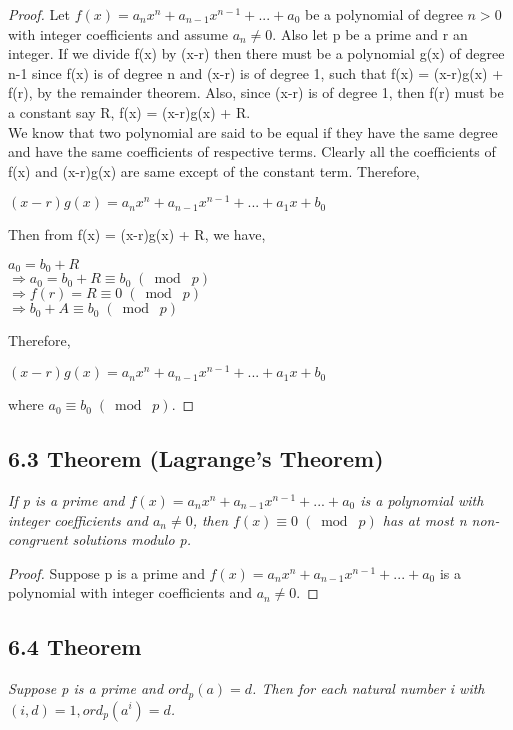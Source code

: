 \documentclass{article}
\begin{document}
\begin{proof}
Let $f(x) = a_nx^n + a_{n-1}x^{n-1} + ... + a_0$ be a polynomial of degree $n > 0$ with integer coefficients and assume $a_n \neq 0$. Also let p be a prime and r an integer. If we divide f(x) by (x-r) then there must be a polynomial g(x) of degree n-1 since f(x) is of degree n and (x-r) is of degree 1, such that f(x) = (x-r)g(x) + f(r), by the remainder theorem. Also, since (x-r) is of degree 1, then f(r) must be a constant say R, f(x) = (x-r)g(x) + R.\\
We know that two polynomial are said to be equal if they have the same degree and have the same coefficients of respective terms. Clearly all the coefficients of f(x) and (x-r)g(x) are same except of the constant term. Therefore,
\begin{center}
    $(x-r)g(x) = a_nx^n + a_{n-1}x^{n-1} + ... + a_1x + b_0$
\end{center}
Then from f(x) = (x-r)g(x) + R, we have,
\begin{center}
    $a_0 = b_0 + R$\\
    $\Longrightarrow a_0 = b_0 + R \equiv b_0 \;(\bmod\; p)$\\
    $\Longrightarrow f(r) = R \equiv 0 \;(\bmod\; p)$\\
    $\Longrightarrow b_0 + A \equiv b_0 \;(\bmod\; p)$
\end{center}
Therefore, 
\begin{center}
    $(x-r)g(x) = a_nx^n + a_{n-1}x^{n-1} + ... + a_1x + b_0$
\end{center}
where $a_0 \equiv b_0 \;(\bmod\; p)$.
\end{proof}

\subsection*{6.3 Theorem (Lagrange's Theorem)} 
\quad \textit{If p is a prime and $f(x) = a_nx^n + a_{n-1}x^{n-1} + ... + a_0$ is a polynomial with integer coefficients and $a_n \neq 0$, then $f(x) \equiv 0 \;(\bmod\; p)$ has at most n non-congruent solutions modulo p.}

\begin{proof}
Suppose p is a prime and $f(x) = a_nx^n + a_{n-1}x^{n-1} + ... + a_0$ is a polynomial with integer coefficients and $a_n \neq 0$.
\end{proof}

\subsection*{6.4 Theorem} 
\quad \textit{Suppose p is a prime and $ord_p(a) = d$. Then for each natural number i with $(i, d) = 1, ord_p(a^i) = d$.}
\end{document}

